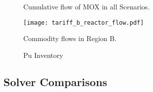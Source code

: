 \begin{figure}
  \centering
  \begin{minipage}{\textwidth}
    \centering
  \end{minipage}%
  \caption[]{
    \label{fig:prefs}
    Cumulative flow of MOX in all Scenarios.}
\end{figure}


\begin{figure}
  \begin{center}
    \texttt{[image: tariff\_b\_reactor\_flow.pdf]}
    \caption[]{
      \label{fig:prefs}
      Commodity flows in Region B.}
  \end{center}
\end{figure}

\begin{figure}
  \centering
  \begin{minipage}{0.5\columnwidth}
    \centering
    \vfill
  \end{minipage}%
  \begin{minipage}{0.5\columnwidth}
    \centering
    \vfill
  \end{minipage}
  \caption{Pu Inventory}\label{foo}
\end{figure}

\subsection{Solver Comparisons}

